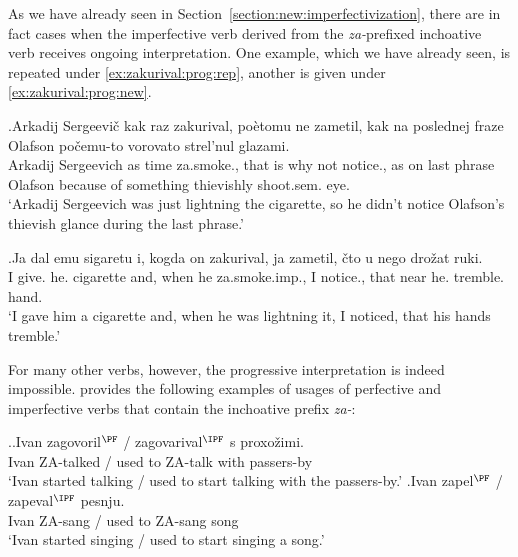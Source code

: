 As we have already seen in Section~\ref{section:new:imperfectivization}, there are in fact cases when the imperfective verb derived from the \textit{za-}prefixed inchoative verb receives ongoing interpretation. One example, which we have already seen, is repeated under \ref{ex:zakurival:prog:rep}, another is given under \ref{ex:zakurival:prog:new}.

\exg.\label{ex:zakurival:prog:rep}Arkadij Sergeevi\v{c} kak raz zakurival, po\`{e}tomu ne zametil, kak na poslednej fraze Olafson po\v{c}emu-to vorovato strel'nul glazami.\\
Arkadij Sergeevich as time za.smoke., {that is why} not notice., as on last phrase Olafson {because of something} thievishly shoot.sem. eye.\\
\trans `Arkadij Sergeevich was just lightning the cigarette, so he didn't notice Olafson's thievish glance during the last phrase.'

\exg.\label{ex:zakurival:prog:new}Ja dal emu sigaretu i, kogda on zakurival, ja zametil, \v{c}to u nego dro\v{z}at ruki.\\
I give. he. cigarette and, when he za.smoke.imp., I notice., that near he. tremble. hand.\\
\trans `I gave him a cigarette and, when he was lightning it, I noticed, that his hands tremble.'\\

For many other verbs, however, the progressive interpretation is indeed impossible. \citet{Braginsky:08} provides the following examples of usages of perfective and imperfective verbs that contain the inchoative prefix \textit{za-}:

\ex.\label{ex:za:imp:Brag}\ag.\label{ex:za:imp:Brag1}Ivan zagovoril$^{\PF}$ / zagovarival$^{\IPF}$ s proxo\v{z}imi.\\
Ivan ZA-talked / {used to ZA-talk} with passers-by\\
\trans `Ivan started talking / used to start talking with the passers-by.'
\bg.\label{ex:za:imp:Brag2}Ivan zapel$^{\PF}$ / zapeval$^{\IPF}$ pesnju.\\
Ivan ZA-sang / {used to ZA-sang} song\\
\trans `Ivan started singing / used to start singing a song.'\\

